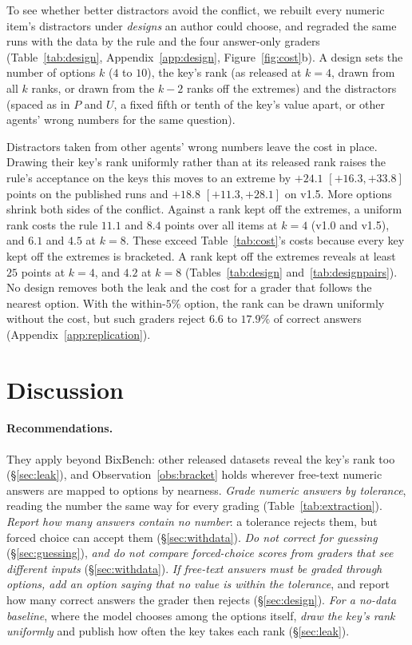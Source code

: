 \documentclass{article}
\begin{document}
To see whether better distractors avoid the conflict, we rebuilt every numeric item's distractors under
\emph{designs} an author could choose, and regraded the same runs with the data by the rule and the four answer-only
graders (Table~\ref{tab:design}, Appendix~\ref{app:design}, Figure~\ref{fig:cost}b). A design
sets the number of options $k$ ($4$ to $10$), the key's rank (as released at $k=4$, drawn from all $k$ ranks, or
drawn from the $k-2$ ranks off the extremes) and the distractors (spaced as in $P$ and $U$, a fixed fifth or tenth of
the key's value apart, or other agents' wrong numbers for the same question).

Distractors taken from other agents' wrong numbers leave the cost in place. Drawing
their key's rank uniformly rather than at its released rank raises the rule's acceptance on the keys this moves to an
extreme by $+24.1$ $[+16.3,+33.8]$ points on the published runs and $+18.8$ $[+11.3,+28.1]$ on v1.5. More options
shrink both sides of the conflict. Against a rank kept off the extremes, a uniform rank costs the rule $11.1$ and $8.4$
points over all items at $k=4$ (v1.0 and v1.5), and $6.1$ and $4.5$ at $k=8$. These exceed Table~\ref{tab:cost}'s costs because every key kept off the extremes is bracketed. A rank kept off the extremes
reveals at least $25$ points at $k=4$, and $4.2$ at $k=8$ (Tables~\ref{tab:design} and~\ref{tab:designpairs}). No
design removes both the leak and the cost for a grader that follows the nearest option. With the within-$5\%$ option,
the rank can be drawn uniformly without the cost, but such graders reject $6.6$ to $17.9\%$ of correct answers
(Appendix~\ref{app:replication}).

\section{Discussion}
\label{sec:discussion}

\paragraph{Recommendations.} They apply beyond BixBench: other released datasets reveal the key's rank too
(\S\ref{sec:leak}), and Observation~\ref{obs:bracket} holds wherever free-text numeric answers are mapped to options by
nearness. \emph{Grade numeric answers by tolerance}, reading the number the same way for every grading
(Table~\ref{tab:extraction}). \emph{Report how many answers contain no number}: a tolerance rejects them, but forced
choice can accept them (\S\ref{sec:withdata}). \emph{Do not correct for guessing} (\S\ref{sec:guessing}), \emph{and do
not compare forced-choice scores from graders that see different inputs} (\S\ref{sec:withdata}). \emph{If free-text
answers must be graded through options, add an option saying that no value is within the tolerance}, and report how
many correct answers the grader then rejects (\S\ref{sec:design}). \emph{For a no-data baseline}, where the model
chooses among the options itself, \emph{draw the key's rank uniformly} and publish how often the key takes each rank
(\S\ref{sec:leak}).
\end{document}
